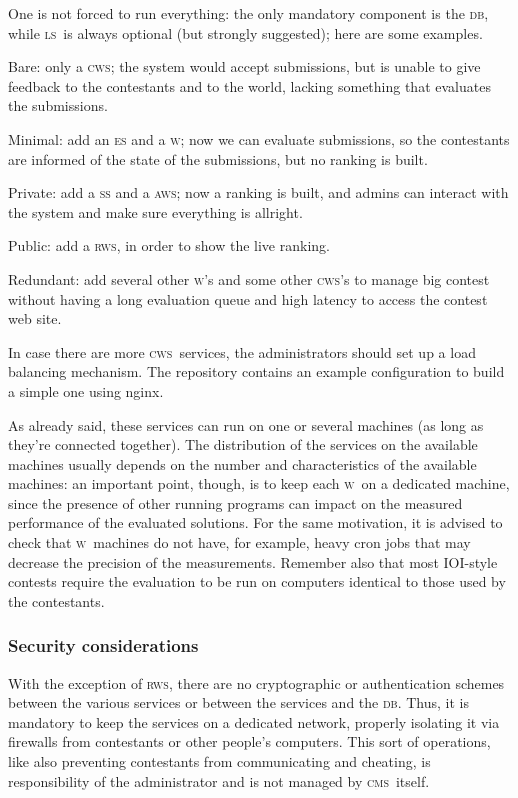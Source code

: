 \documentclass[a4paper,8pt]{amsart}
\newcommand{\CMS}{\textsc{cms}}
\newcommand{\DB}{\textsc{db}}
\newcommand{\LS}{\textsc{ls}}
\newcommand{\ES}{\textsc{es}}
\newcommand{\WS}{\textsc{w}}
\renewcommand{\SS}{\textsc{ss}}
\newcommand{\CWS}{\textsc{cws}}
\newcommand{\AWS}{\textsc{aws}}
\newcommand{\RWS}{\textsc{rws}}
\newenvironment{squishlist}{%
  \begin{list}{\textbullet}%
    { \setlength{\itemsep}{0pt}%
      \setlength{\parsep}{3pt}%
      \setlength{\topsep}{3pt}%
      \setlength{\partopsep}{0pt}%
      \setlength{\leftmargin}{1.5em}%
      \setlength{\labelwidth}{1em}%
      \setlength{\labelsep}{0.5em} }%
}{\end{list}}
\begin{document}
\begin{multicols}{2}
  One is not forced to run everything: the only mandatory component is
  the \DB, while \LS\ is always optional (but strongly suggested);
  here are some examples.
  \begin{squishlist}
  \item Bare: only a \CWS{}; the system would accept submissions, but
    is unable to give feedback to the contestants and to the world,
    lacking something that evaluates the submissions.
  \item Minimal: add an \ES{} and a \WS{}; now we can evaluate
    submissions, so the contestants are informed of the state of the
    submissions, but no ranking is built.
  \item Private: add a \SS{} and a \AWS{}; now a ranking is built, and
    admins can interact with the system and make sure everything is
    allright.
  \item Public: add a \RWS{}, in order to show the live ranking.
  \item Redundant: add several other \WS{}'s and some other \CWS{}'s
    to manage big contest without having a long evaluation queue and
    high latency to access the contest web site.
  \end{squishlist}

  In case there are more \CWS\ services, the administrators should set
  up a load balancing mechanism. The repository contains an example
  configuration to build a simple one using nginx.

  As already said, these services can run on one or several machines
  (as long as they're connected together). The distribution of the
  services on the available machines usually depends on the number and
  characteristics of the available machines: an important point,
  though, is to keep each \WS\ on a dedicated machine, since the
  presence of other running programs can impact on the measured
  performance of the evaluated solutions. For the same motivation, it
  is advised to check that \WS\ machines do not have, for example,
  heavy cron jobs that may decrease the precision of the
  measurements. Remember also that most IOI-style contests require the
  evaluation to be run on computers identical to those used by the
  contestants.

  \subsubsection{Security considerations}

  With the exception of \RWS, there are no cryptographic or
  authentication schemes between the various services or between the
  services and the \DB. Thus, it is mandatory to keep the services on
  a dedicated network, properly isolating it via firewalls from
  contestants or other people's computers. This sort of operations,
  like also preventing contestants from communicating and cheating, is
  responsibility of the administrator and is not managed by
  \CMS\ itself.


\end{multicols}
\end{document}
